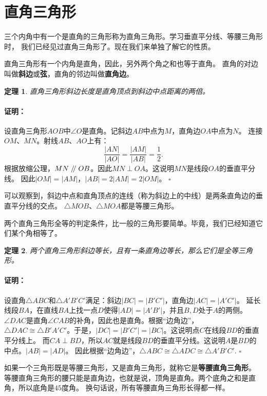 \documentclass[12pt,UTF8]{ctexbook}
\newtheorem{tm}{定理}[section]
\newenvironment{proof2}{\paragraph{\textbf{证明：}}}{\hfill$\square$}
\renewcommand\parallel{\mathrel{/\mskip-4mu/}}
\begin{document}
\section{直角三角形}
三个内角中有一个是直角的三角形称为直角三角形。学习垂直平分线、等腰三角形时，
我们已经见过直角三角形了。现在我们来单独了解它的性质。

直角三角形有一个内角是直角，因此，另外两个角之和也等于直角。
直角的对边叫做\textbf{斜边}或\textbf{弦}，直角的邻边叫做\textbf{直角边}。

\begin{tm}\label{tm:4-1-0}
    直角三角形斜边长度是直角顶点到斜边中点距离的两倍。
\end{tm}
\begin{proof2}
    设直角三角形$AOB$中$\angle O$是直角。记斜边$AB$中点为$M$，直角边$OA$中点为$N$。
    连接$OM$、$MN$。射线$AB$、$AO$上有：
    $$ \frac{|AN|}{|AO|} = \frac{|AM|}{|AB|} = \frac12.$$
    根据放缩公理，$MN \parallel OB$。因此$MN \perp OA$。这说明$MN$是线段$OA$的垂直平分线。
    因此$|OM| = |AM|$，$|AB| = 2|AM| = 2|OM|$。
\end{proof2}

可以观察到，斜边中点和直角顶点的连线（称为斜边上的中线）是两条直角边的垂直平分线的交点。
$\triangle MOB$、$\triangle MOA$都是等腰三角形。

两个直角三角形全等的判定条件，比一般的三角形要简单。毕竟，我们已经知道它们某个角相等了。

\begin{tm}\label{tm:4-1-1}
    两个直角三角形斜边等长，且有一条直角边等长，那么它们是全等三角形。
\end{tm}
\begin{proof2}
    设直角$\triangle ABC$和$\triangle A'B'C'$满足：斜边$|BC| = |B'C'|$，直角边$|AC| = |A'C'|$。
    延长线段$BA$，在直线$BA$上找一点$D$使得$|AD| = |A'B'|$，并且$B,D$处于$A$的两侧。
    $\angle DAC$是直角$\angle CAB$的补角，因此也是直角。根据“边角边”，
    $\triangle DAC \cong \triangle B'A'C'$。于是，$|DC| = |B'C'| = |BC|$。这说明点$C$在线段$BD$的垂直平分线上。
    而$CA \perp BD$，所以$AC$就是线段$BD$的垂直平分线。这说明$A$是$BD$的中点。$|AB| = |AD|$。
    因此根据“边角边”，$\triangle ABC \cong \triangle ADC \cong \triangle A'B'C'.$
\end{proof2}

如果一个三角形既是等腰三角形，又是直角三角形，就称它是\textbf{等腰直角三角形}。
等腰直角三角形的腰只能是直角边，也就是说，顶角是直角。两个底角之和是直角，所以底角是$45$度角。
换句话说，所有等腰直角三角形长得都一样。
\end{document}
